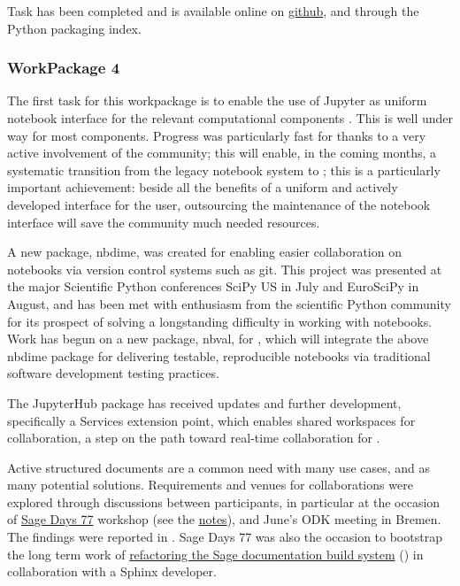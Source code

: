 \documentclass{deliverablereport}
\begin{document}
  Task  has been completed and
  is available online on \href{https://github.com/joommf/oommfc}{github}, and through the
  Python packaging index.

  \subsubsection{WorkPackage 4}
  The first task for this workpackage is to enable the use of Jupyter as uniform notebook
  interface for the relevant computational components . This
  is well under way for most components. Progress was particularly fast for \Sage thanks
  to a very active involvement of the community; this will enable, in the coming months, a
  systematic transition from the legacy \Sage notebook system to \Jupyter; this is a
  particularly important achievement: beside all the benefits of a uniform and actively
  developed interface for the user, outsourcing the maintenance of the notebook interface
  will save the \Sage community much needed resources.

  A new \Jupyter package, nbdime, was created for  enabling
  easier collaboration on notebooks via version control systems such as git.  This project
  was presented at the major Scientific Python conferences SciPy US in July and EuroSciPy
  in August, and has been met with enthusiasm from the scientific Python community for its
  prospect of solving a longstanding difficulty in working with notebooks.  Work has begun
  on a new package, nbval, for , which will integrate the above
  nbdime package for delivering testable, reproducible notebooks via traditional software
  development testing practices.

  The JupyterHub package has received updates and further development, specifically a
  Services extension point, which enables shared workspaces for collaboration, a step on
  the path toward real-time collaboration for .

  Active structured documents are a common need with many use cases, and as many potential
  solutions. Requirements and venues for collaborations were explored through discussions
  between participants, in particular at the occasion of
  \href{https://wiki.sagemath.org/days77/}{Sage Days 77} workshop (see the
  \href{https://wiki.sagemath.org/days77/live-structured-documents}{notes}), and June's
  ODK meeting in Bremen. The findings were reported in . Sage Days 77
  was also the occasion to bootstrap the long term work of
  \href{https://wiki.sagemath.org/days77/documentation}{refactoring the Sage documentation
    build system} () in collaboration with a Sphinx developer.
\end{document}
